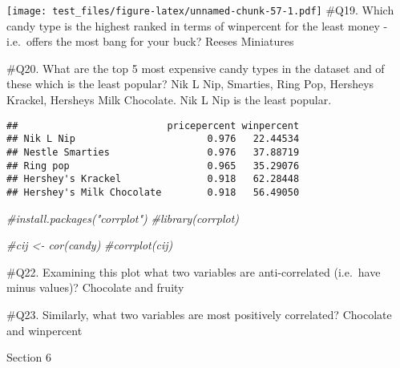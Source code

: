 \documentclass[
]{article}
\newenvironment{Shaded}{\begin{snugshade}}{\end{snugshade}}
\newcommand{\AttributeTok}[1]{\textcolor[rgb]{0.77,0.63,0.00}{#1}}
\newcommand{\CommentTok}[1]{\textcolor[rgb]{0.56,0.35,0.01}{\textit{#1}}}
\newcommand{\ConstantTok}[1]{\textcolor[rgb]{0.00,0.00,0.00}{#1}}
\newcommand{\DecValTok}[1]{\textcolor[rgb]{0.00,0.00,0.81}{#1}}
\newcommand{\FunctionTok}[1]{\textcolor[rgb]{0.00,0.00,0.00}{#1}}
\newcommand{\NormalTok}[1]{#1}
\newcommand{\OtherTok}[1]{\textcolor[rgb]{0.56,0.35,0.01}{#1}}
\newcommand{\SpecialCharTok}[1]{\textcolor[rgb]{0.00,0.00,0.00}{#1}}
\begin{document}
\texttt{[image: test\_files/figure-latex/unnamed-chunk-57-1.pdf]} \#Q19.
Which candy type is the highest ranked in terms of winpercent for the
least money - i.e.~offers the most bang for your buck? Reeses Miniatures

\#Q20. What are the top 5 most expensive candy types in the dataset and
of these which is the least popular? Nik L Nip, Smarties, Ring Pop,
Hersheys Krackel, Hersheys Milk Chocolate. Nik L Nip is the least
popular.

\begin{Shaded}
\end{Shaded}

\begin{verbatim}
##                          pricepercent winpercent
## Nik L Nip                       0.976   22.44534
## Nestle Smarties                 0.976   37.88719
## Ring pop                        0.965   35.29076
## Hershey's Krackel               0.918   62.28448
## Hershey's Milk Chocolate        0.918   56.49050
\end{verbatim}

\begin{Shaded}
\begin{Highlighting}[]
\CommentTok{\#install.packages("corrplot")}
\CommentTok{\#library(corrplot)}
\end{Highlighting}
\end{Shaded}

\begin{Shaded}
\begin{Highlighting}[]
\CommentTok{\#cij \textless{}{-} cor(candy)}
\CommentTok{\#corrplot(cij)}
\end{Highlighting}
\end{Shaded}

\#Q22. Examining this plot what two variables are anti-correlated
(i.e.~have minus values)? Chocolate and fruity

\#Q23. Similarly, what two variables are most positively correlated?
Chocolate and winpercent

Section 6
\end{document}
